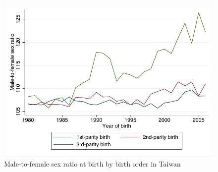 \begin{figure}[]

    \includegraphics[width=0.6\columnwidth]{figures/sex-ratio-by-birth-order.pdf}

    \caption{Male-to-female sex ratio at birth by birth order in Taiwan}
    \label{fig:sex-ratio-by-birth-order}
\end{figure}

